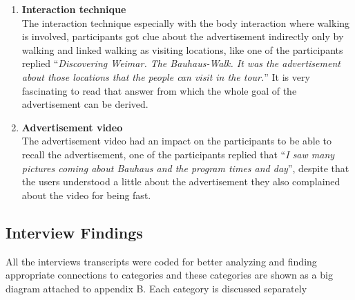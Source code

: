 \begin{itemize}
\begin{enumerate}
\item	\textbf{Interaction technique} \\
The interaction technique especially with the body interaction where walking is involved, participants got clue about the advertisement indirectly only by walking and linked walking as visiting locations, like one of the participants replied ``\emph{Discovering Weimar. The Bauhaus-Walk. It was the advertisement about those locations that the people can visit in the tour.}'' It is very fascinating to read that answer from which the whole goal of the advertisement can be derived.

\item	\textbf{Advertisement video} \\
The advertisement video had an impact on the participants to be able to recall the advertisement, one of the participants replied that ``\emph{I saw many pictures coming about Bauhaus and the program times and day}'', despite that the users understood a little about the advertisement they also complained about the video for being fast.

\end{enumerate}

\end{itemize}

\subsection{Interview Findings}
All the interviews transcripts were coded for better analyzing and finding appropriate connections to categories and these categories are shown as a big diagram attached to appendix B. Each category is discussed separately \\

